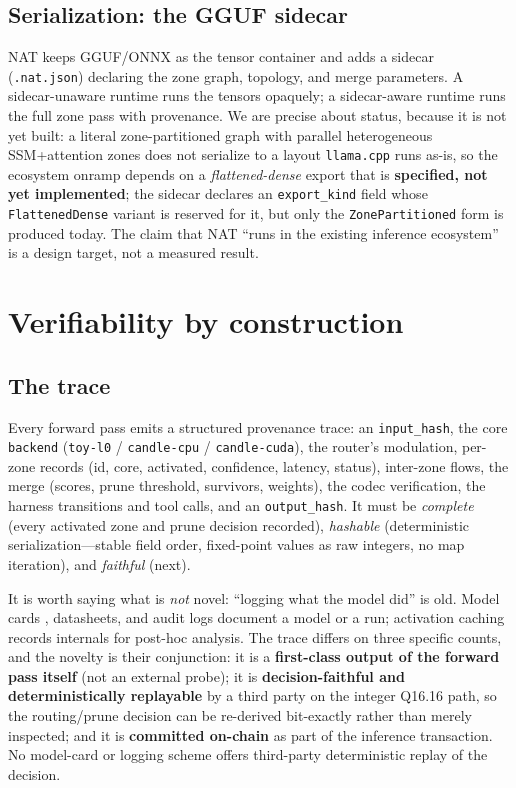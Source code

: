 \documentclass[11pt]{article}
\newcommand{\Qff}{Q16.16}
\begin{document}
\subsection{Serialization: the GGUF sidecar}
NAT keeps GGUF/ONNX as the tensor container and adds a sidecar (\texttt{.nat.json}) declaring the zone
graph, topology, and merge parameters. A sidecar-unaware runtime runs the tensors opaquely; a
sidecar-aware runtime runs the full zone pass with provenance. We are precise about status, because it
is not yet built: a literal zone-partitioned graph with parallel heterogeneous SSM+attention zones
does not serialize to a layout \texttt{llama.cpp} runs as-is, so the ecosystem onramp depends on a
\emph{flattened-dense} export that is \textbf{specified, not yet implemented}; the sidecar declares an
\texttt{export\_kind} field whose \texttt{FlattenedDense} variant is reserved for it, but only the
\texttt{ZonePartitioned} form is produced today. The claim that NAT ``runs in the existing inference
ecosystem'' is a design target, not a measured result.

\section{Verifiability by construction}\label{sec:verif}

\subsection{The trace}
Every forward pass emits a structured provenance trace: an \texttt{input\_hash}, the core
\texttt{backend} (\texttt{toy-l0} / \texttt{candle-cpu} / \texttt{candle-cuda}), the router's
modulation, per-zone records (id, core, activated, confidence, latency, status), inter-zone flows,
the merge (scores, prune threshold, survivors, weights), the codec verification, the harness
transitions and tool calls, and an \texttt{output\_hash}. It must be \emph{complete} (every activated
zone and prune decision recorded), \emph{hashable} (deterministic serialization---stable field order,
fixed-point values as raw integers, no map iteration), and \emph{faithful} (next).

It is worth saying what is \emph{not} novel: ``logging what the model did'' is old. Model cards
\citep{mitchell2019model}, datasheets, and audit logs document a model or a run; activation caching
records internals for post-hoc analysis. The trace differs on three specific counts, and the novelty
is their conjunction: it is a \textbf{first-class output of the forward pass itself} (not an external
probe); it is \textbf{decision-faithful and deterministically replayable} by a third party on the
integer \Qff{} path, so the routing/prune decision can be re-derived bit-exactly rather than merely
inspected; and it is \textbf{committed on-chain} as part of the inference transaction. No model-card
or logging scheme offers third-party deterministic replay of the decision.
\end{document}
